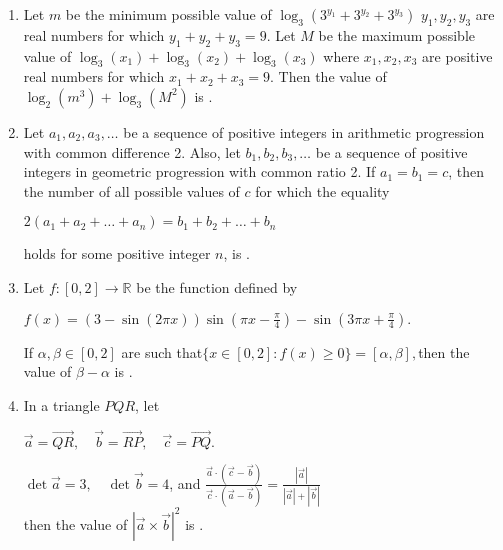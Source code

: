 \documentclass{article}
\begin{document}
\begin{enumerate}
\item   Let $m$ be the minimum possible value of $\log_3(3^{y_1} + 3^{y_2} + 3^{y_3})$ $y_1, y_2, y_3$ are real numbers for which $y_1 + y_2 + y_3 = 9$. Let $M$ be the maximum possible value of $\log_3(x_1) + \log_3(x_2) + \log_3(x_3)$ where $x_1, x_2, x_3$ are positive real numbers for which $x_1 + x_2 + x_3 = 9$. Then the value of $\log_2(m^3) + \log_3(M^2)$ is \underline{\hspace{2cm}}.

\item   Let $a_1, a_2, a_3, \dots $ be a sequence of positive integers in arithmetic progression with common difference 2. Also, let $b_1, b_2, b_3, \dots $ be a sequence of positive integers in geometric progression with common ratio 2. If $a_1 = b_1 = c$, then the number of all possible values of $c$ for which the equality 

\begin{center}
    $ 2(a_1 + a_2 + \dots + a_n) = b_1 + b_2 + \dots + b_n $
\end{center}

    holds for some positive integer $n$, is \underline{\hspace{2cm}}.

\item   Let $f: [0,2] \to \mathbb{R}$ be the function defined by

\begin{center}
    $f(x) = (3 - \sin(2\pi x)) \sin\left(\pi x - \frac{\pi}{4}\right) - \sin(3\pi x + \frac{\pi}{4}).$
\end{center}
If $\alpha, \beta \in [0,2]$ are such that$\{ x \in [0,2] : f(x) \geq 0 \} = [\alpha, \beta],$then the value of $\beta - \alpha$ is \underline{\hspace{2cm}}.

\item   In a triangle $PQR$, let 
   
\begin{center}
   $\vec{a} = \overrightarrow{QR}, \quad \vec{b} = \overrightarrow{RP}, \quad \vec{c} = \overrightarrow{PQ}.$
\end{center}

	$\det{\vec{a}}= 3, \quad \det{\vec{b}} = 4$, and 
	$\frac{\vec{a} \cdot (\vec{c} - \vec{b})}{\vec{c} \cdot (\vec{a} - \vec{b})} = \frac{|\vec{a}|}{|\vec{a}| + |\vec{b}|}$\\

    then the value of $|\vec{a} \times \vec{b}|^2$ is \underline{\hspace{2cm}}.


\end{enumerate}
\end{document}

